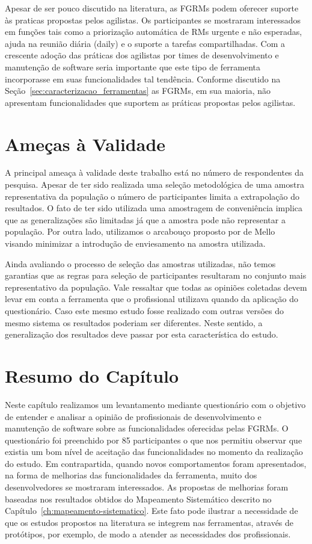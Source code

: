 Apesar de ser pouco discutido na literatura, as FGRMs podem oferecer suporte às
praticas propostas pelos agilistas. Os participantes se mostraram interessados
em funções tais como a priorização automática de RMs urgente e não esperadas,
ajuda na reunião diária (daily) e o suporte a tarefas compartilhadas. Com a
crescente adoção das práticas dos agilistas por times de desenvolvimento e
manutenção de software seria importante que este tipo de ferramenta incorporasse
em suas funcionalidades tal tendência. Conforme discutido na
Seção~\ref{sec:caracterizacao_ferramentas} as FGRMs, em sua maioria, não
apresentam funcionalidades que suportem as práticas propostas pelos agilistas.

\section{Ameças à Validade}
\label{sec:pesquisa_profissionais_ameacas_validade}

A principal ameaça à validade deste trabalho está no número de respondentes da
pesquisa. Apesar de ter sido realizada uma seleção metodológica de uma amostra
representativa da população o número de participantes limita a extrapolação do
resultados. O fato de ter sido utilizada uma amostragem de conveniência implica
que as generalizações são limitadas já que a amostra pode não representar a
população. Por outra lado, utilizamos o arcabouço proposto por de
Mello~\cite{de2014towards} visando minimizar a introdução de enviesamento na
amostra utilizada.

Ainda avaliando o processo de seleção das amostras utilizadas, não temos
garantias que as regras para seleção de participantes resultaram no conjunto
mais representativo da população. Vale ressaltar que todas as opiniões coletadas
devem levar em conta a ferramenta que o profissional utilizava quando da
aplicação do questionário. Caso este mesmo estudo fosse realizado com outras
versões do mesmo sistema os resultados poderiam ser diferentes. Neste sentido, a
generalização dos resultados deve passar por esta característica do estudo.

\section{Resumo do Capítulo}
\label{sec:resumo_do_capitulo}

Neste capítulo realizamos um levantamento mediante questionário com o objetivo
de entender e analisar a opinião de profissionais de desenvolvimento e
manutenção de software sobre as funcionalidades oferecidas pelas FGRMs. O
questionário foi preenchido por 85 participantes o que nos permitiu observar que
existia um bom nível de aceitação das funcionalidades no momento da realização
do estudo. Em contrapartida, quando novos comportamentos foram apresentados, na
forma de melhorias das funcionalidades da ferramenta, muito dos desenvolvedores
se mostraram interessados. As propostas de melhorias foram baseadas nos
resultados obtidos do Mapeamento Sistemático descrito no
Capítulo~\ref{ch:mapeamento-sistematico}. Este fato pode ilustrar a necessidade
de que os estudos propostos na literatura se integrem nas ferramentas, através
de protótipos, por exemplo, de modo a atender as necessidades dos profissionais.
